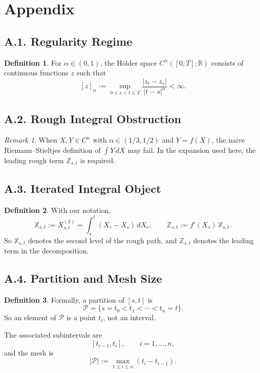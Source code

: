 \documentclass[11pt]{article}
\theoremstyle{definition}
\newtheorem{definition}{Definition}
\theoremstyle{remark}
\newtheorem{remark}{Remark}
\begin{document}
\section*{Appendix}
\subsection*{A.1. Regularity Regime}
\begin{definition}
For $\alpha\in(0,1)$, the H\"older space $C^\alpha([0,T];\mathbb R)$ consists of continuous functions $z$ such that
\[
[z]_\alpha:=\sup_{0\le s<t\le T}\frac{|z_t-z_s|}{|t-s|^\alpha}<\infty.
\]
\end{definition}

\subsection*{A.2. Rough Integral Obstruction}
\begin{remark}
When $X,Y\in C^\alpha$ with $\alpha\in(1/3,1/2)$ and $Y=f(X)$, the naive Riemann--Stieltjes definition of $\int Y\,dX$ may fail. In the expansion used here, the leading rough term $\mathbb{Z}_{s,t}$ is required.
\end{remark}

\subsection*{A.3. Iterated Integral Object}
\begin{definition}
With our notation,
\[
\mathbb{X}_{s,t}:=X_{s,t}^{(2)}=\int_s^t (X_r-X_s)\,dX_r,
\qquad
\mathbb{Z}_{s,t}:=f'(X_s)\,\mathbb{X}_{s,t}.
\]
So $\mathbb{X}_{s,t}$ denotes the second level of the rough path, and $\mathbb{Z}_{s,t}$ denotes the leading term in the decomposition.
\end{definition}

\subsection*{A.4. Partition and Mesh Size}
\begin{definition}
Formally, a partition of $[s,t]$ is
\[
\mathcal P=\{s=t_0<t_1<\cdots<t_n=t\}.
\]
So an element of $\mathcal P$ is a point $t_i$, not an interval.

The associated subintervals are
\[
[t_{i-1},t_i],\qquad i=1,\dots,n,
\]
and the mesh is
\[
|\mathcal P|
:=
\max_{1\le i\le n}(t_i-t_{i-1}).
\]
\end{definition}
\end{document}
